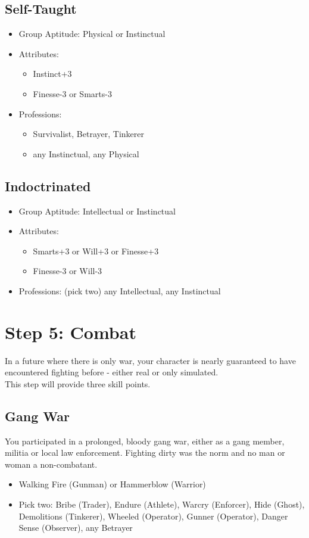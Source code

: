 \subsection{Self-Taught}
\begin{itemize}
	\item Group Aptitude: Physical or Instinctual
	\item Attributes:
	\begin{itemize}
		\item Instinct+3
		\item Finesse-3 or Smarts-3
	\end{itemize}
	\item Professions:
	\begin{itemize}
		\item Survivalist, Betrayer, Tinkerer
		\item any Instinctual, any Physical
	\end{itemize}
\end{itemize}

\subsection{Indoctrinated}
\begin{itemize}
	\item Group Aptitude: Intellectual or Instinctual
	\item Attributes:
	\begin{itemize}
		\item Smarts+3 or Will+3 or Finesse+3
		\item Finesse-3 or Will-3
	\end{itemize}
	\item Professions: (pick two) any Intellectual, any Instinctual
\end{itemize}



\section{Step 5: Combat} %
\label{sec:lifepath_5_combat}
In a future where there is only war, your character is nearly guaranteed to have encountered fighting before - either real or only simulated.\\
This step will provide three skill points.

\subsection{Gang War}
You participated in a prolonged, bloody gang war, either as a gang member, militia or local law enforcement. Fighting dirty was the norm and no man or woman a non-combatant.
\begin{itemize}
	\item Walking Fire (Gunman) or Hammerblow (Warrior)
	\item Pick two: Bribe (Trader), Endure (Athlete), Warcry (Enforcer), Hide (Ghost), Demolitions (Tinkerer), Wheeled (Operator), Gunner (Operator), Danger Sense (Observer), any Betrayer
\end{itemize}

